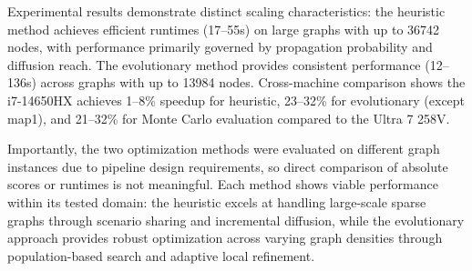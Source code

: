 \documentclass[onecolumn,a4paper,12pt]{IEEEtran}
\begin{document}
Experimental results demonstrate distinct scaling characteristics: the heuristic method achieves efficient runtimes (17--55s) on large graphs with up to 36742 nodes, with performance primarily governed by propagation probability and diffusion reach. The evolutionary method provides consistent performance (12--136s) across graphs with up to 13984 nodes. Cross-machine comparison shows the i7-14650HX achieves 1--8\% speedup for heuristic, 23--32\% for evolutionary (except map1), and 21--32\% for Monte Carlo evaluation compared to the Ultra 7 258V.

Importantly, the two optimization methods were evaluated on different graph instances due to pipeline design requirements, so direct comparison of absolute scores or runtimes is not meaningful. Each method shows viable performance within its tested domain: the heuristic excels at handling large-scale sparse graphs through scenario sharing and incremental diffusion, while the evolutionary approach provides robust optimization across varying graph densities through population-based search and adaptive local refinement.

\newpage

 
 
        
\end{document}
